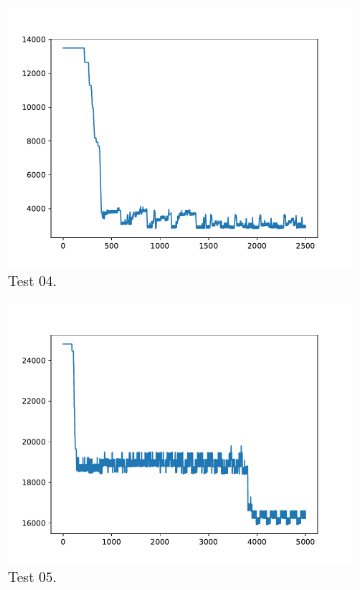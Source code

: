 \begin{figure}[h!]
\begin{subfigure}{0.35
            \textwidth}
        \includegraphics[width=\textwidth]{../logs/test04.pdf}
        \caption{Test $04$.}
    \end{subfigure}
    \begin{subfigure}{0.35
            \textwidth}
        \includegraphics[width=\textwidth]{../logs/test05.pdf}
        \caption{Test $05$.}
    \end{subfigure}
    \begin{subfigure}{0.35
            \textwidth}

\end{subfigure}
\end{figure}
